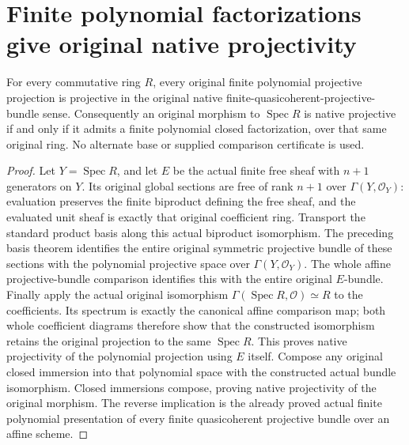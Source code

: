 \section{Finite polynomial factorizations give original native projectivity}
\label{sec:native-projectivity-from-polynomial-factorization}

\begin{theorem}
\label{thm:native-projectivity-from-polynomial-factorization}
\leanok
{}
For every commutative ring $R$, every original finite polynomial
projective projection is projective in the original native
finite-quasicoherent-projective-bundle sense. Consequently an original
morphism to $\operatorname{Spec}R$ is native projective if and only if
it admits a finite polynomial closed factorization, over that same
original ring. No alternate base or supplied comparison certificate
is used.
\end{theorem}

\begin{proof}
Let $Y=\operatorname{Spec}R$, and let $E$ be the actual finite free
sheaf with $n+1$ generators on $Y$. Its original global sections are
free of rank $n+1$ over $\Gamma(Y,\mathcal O_Y)$: evaluation preserves
the finite biproduct defining the free sheaf, and the evaluated unit
sheaf is exactly that original coefficient ring. Transport the
standard product basis along this actual biproduct isomorphism.
The preceding basis theorem identifies the entire original symmetric
projective bundle of these sections with the polynomial projective
space over $\Gamma(Y,\mathcal O_Y)$. The whole affine projective-bundle
comparison identifies this with the entire original $E$-bundle.
Finally apply the actual original isomorphism
$\Gamma(\operatorname{Spec}R,\mathcal O)\simeq R$ to the coefficients.
Its spectrum is exactly the canonical affine comparison map; both
whole coefficient diagrams therefore show that the constructed
isomorphism retains the original projection to the same
$\operatorname{Spec}R$. This proves native projectivity of the
polynomial projection using $E$ itself. Compose any original closed
immersion into that polynomial space with the constructed actual
bundle isomorphism. Closed immersions compose, proving native
projectivity of the original morphism. The reverse implication is
the already proved actual finite polynomial presentation of every
finite quasicoherent projective bundle over an affine scheme.
\end{proof}
